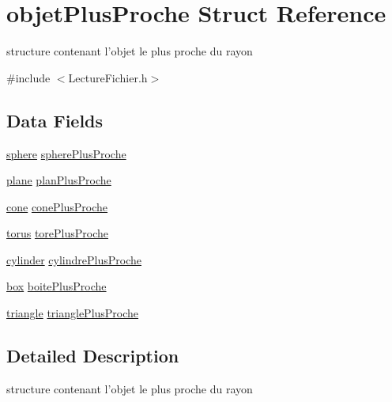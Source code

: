 \hypertarget{structobjet_plus_proche}{
\section{objetPlusProche Struct Reference}
\label{structobjet_plus_proche}
}


structure contenant l'objet le plus proche du rayon  




{\ttfamily \#include $<$LectureFichier.h$>$}

\subsection*{Data Fields}
\begin{DoxyCompactItemize}
\item 
\hyperlink{structsphere}{sphere} \hyperlink{structobjet_plus_proche_ac6f2cdffe1ceb2e5dc9906cc9fa5c22c}{spherePlusProche}
\item 
\hyperlink{structplane}{plane} \hyperlink{structobjet_plus_proche_ad890139230628fabae87ed26f1fe6ea8}{planPlusProche}
\item 
\hyperlink{structcone}{cone} \hyperlink{structobjet_plus_proche_ac8574a6cc1bf3a4b58eface729f4a62a}{conePlusProche}
\item 
\hyperlink{structtorus}{torus} \hyperlink{structobjet_plus_proche_a76825c18c7b4ffdfeab81f867ff1267e}{torePlusProche}
\item 
\hyperlink{structcylinder}{cylinder} \hyperlink{structobjet_plus_proche_acc432b4975a7ecc1e0951e6d449f2c65}{cylindrePlusProche}
\item 
\hyperlink{structbox}{box} \hyperlink{structobjet_plus_proche_aa954bb04d563ca994161aca72deac5d7}{boitePlusProche}
\item 
\hyperlink{structtriangle}{triangle} \hyperlink{structobjet_plus_proche_a41e5fb34eca76ab29fb646b4bfbd25ef}{trianglePlusProche}
\end{DoxyCompactItemize}


\subsection{Detailed Description}
structure contenant l'objet le plus proche du rayon 

